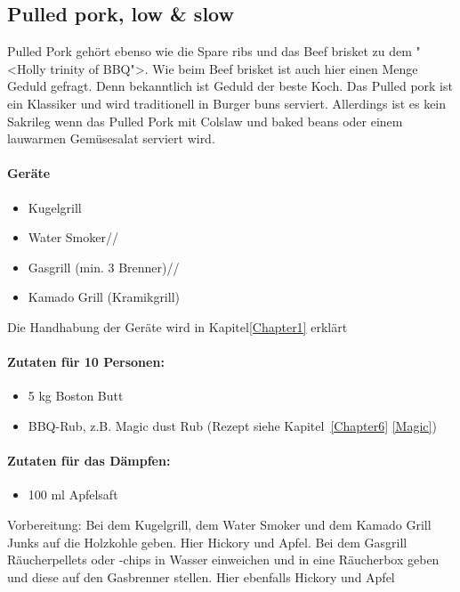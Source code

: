 \subsection{Pulled pork, low \& slow}
Pulled Pork gehört ebenso wie die Spare ribs und das Beef brisket zu 
dem "<Holly trinity of BBQ">. Wie beim Beef brisket ist auch hier einen 
Menge Geduld gefragt. Denn bekanntlich ist Geduld der beste Koch. Das 
Pulled pork ist ein Klassiker und wird traditionell in Burger buns serviert. Allerdings ist 
es kein Sakrileg wenn das Pulled Pork mit Colslaw und baked beans oder 
einem lauwarmen Gemüsesalat serviert wird.

\paragraph{Geräte}

\begin{itemize}[noitemsep]
	\item Kugelgrill
	\item Water Smoker//
 	\item Gasgrill (min. 3 Brenner)//
	\item Kamado Grill (Kramikgrill)
\end{itemize}

Die Handhabung der Geräte wird in Kapitel\ref{Chapter1} erklärt

\paragraph{Zutaten für 10 Personen:}

\begin{itemize}[noitemsep]
	\item 5 kg Boston Butt
	\item BBQ-Rub, z.B. Magic dust Rub (Rezept siehe 
	Kapitel~\ref{Chapter6} \vref{Magic})
\end{itemize}

\paragraph{Zutaten für das Dämpfen:}

\begin{itemize}[noitemsep]
	\item 100 ml Apfelsaft
\end{itemize}

Vorbereitung: Bei dem Kugelgrill, dem Water Smoker und dem Kamado 
Grill Junks auf die Holzkohle geben. Hier Hickory und Apfel.
Bei dem Gasgrill Räucherpellets oder -chips in Wasser einweichen und in 
eine Räucherbox geben und diese auf den Gasbrenner stellen. Hier 
ebenfalls Hickory und Apfel

